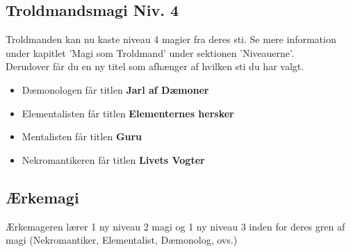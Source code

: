 \subsection{Troldmandsmagi Niv. 4}
Troldmanden kan nu kaste niveau 4 magier fra deres sti. Se mere information under kapitlet 'Magi som Troldmand' under sektionen 'Niveauerne'. \\
Derudover får du en ny titel som afhænger af hvilken sti du har valgt.\\
\begin{itemize}
    \item Dæmonologen får titlen \textbf{Jarl af Dæmoner}
    \item Elementalisten får titlen \textbf{Elementernes hersker}
    \item Mentalisten får titlen \textbf{Guru}
    \item Nekromantikeren får titlen \textbf{Livets Vogter}
\end{itemize}

\subsection{Ærkemagi}
Ærkemageren lærer 1 ny niveau 2 magi og 1 ny niveau 3 inden for deres gren af magi (Nekromantiker, Elementalist, Dæmonolog, ovs.)